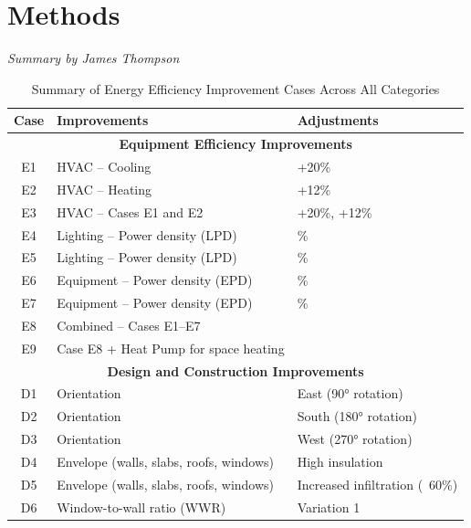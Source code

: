 \documentclass[conference,a4paper]{IEEEtran}
\begin{document}
\section*{Methods}
\textit{Summary by James Thompson}





\appendix


    
      \begin{table}[h]
        \centering
        \caption{Summary of Energy Efficiency Improvement Cases Across All Categories}
        \label{tab:all-cases}
        \begin{tabularx}{\linewidth}{|c|>{\raggedright\arraybackslash}X|>{\raggedright\arraybackslash}X|}
        \hline
        \textbf{Case} & \textbf{Improvements} & \textbf{Adjustments} \\
        \hline
        \multicolumn{3}{|c|}{\textbf{Equipment Efficiency Improvements}} \\
        \hline
        E1 & HVAC – Cooling & +20\% \\
        E2 & HVAC – Heating & +12\% \\
        E3 & HVAC – Cases E1 and E2 & +20\%, +12\% \\
        E4 & Lighting – Power density (LPD) & -15\% \\
        E5 & Lighting – Power density (LPD) & -21\% \\
        E6 & Equipment – Power density (EPD) & -10\% \\
        E7 & Equipment – Power density (EPD) & -20\% \\
        E8 & Combined – Cases E1–E7 & \\
        E9 & Case E8 + Heat Pump for space heating & \\
        \hline
        \multicolumn{3}{|c|}{\textbf{Design and Construction Improvements}} \\
        \hline
        D1 & Orientation & East (90° rotation) \\
        D2 & Orientation & South (180° rotation) \\
        D3 & Orientation & West (270° rotation) \\
        D4 & Envelope (walls, slabs, roofs, windows) & High insulation \\
        D5 & Envelope (walls, slabs, roofs, windows) & Increased infiltration (~60\%) \\
        D6 & Window-to-wall ratio (WWR) & Variation 1 \\

\end{tabularx}
\end{table}
\end{document}
